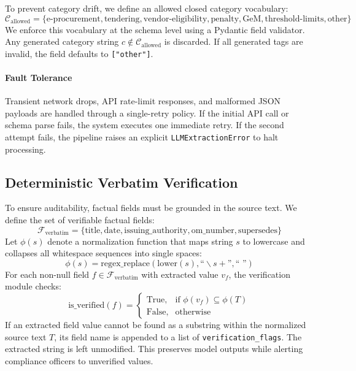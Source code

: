 \documentclass{article}
\begin{document}
To prevent category drift, we define an allowed closed category vocabulary:
\begin{equation}
    \mathcal{C}_{\text{allowed}} = \{\text{e-procurement}, \text{tendering}, \text{vendor-eligibility}, \text{penalty}, \text{GeM}, \text{threshold-limits}, \text{other}\}
\end{equation}
We enforce this vocabulary at the schema level using a Pydantic field validator. Any generated category string $c \notin \mathcal{C}_{\text{allowed}}$ is discarded. If all generated tags are invalid, the field defaults to \texttt{["other"]}.

\paragraph{Fault Tolerance}
Transient network drops, API rate-limit responses, and malformed JSON payloads are handled through a single-retry policy. If the initial API call or schema parse fails, the system executes one immediate retry. If the second attempt fails, the pipeline raises an explicit \texttt{LLMExtractionError} to halt processing.

\subsection{Deterministic Verbatim Verification}
To ensure auditability, factual fields must be grounded in the source text. We define the set of verifiable factual fields:
\begin{equation}
    \mathcal{F}_{\text{verbatim}} = \{\text{title}, \text{date}, \text{issuing\_authority}, \text{om\_number}, \text{supersedes}\}
\end{equation}
Let $\phi(s)$ denote a normalization function that maps string $s$ to lowercase and collapses all whitespace sequences into single spaces:
\begin{equation}
    \phi(s) = \text{regex\_replace}(\text{lower}(s), \text{``}\backslash s+\text{''}, \text{`` ''})
\end{equation}
For each non-null field $f \in \mathcal{F}_{\text{verbatim}}$ with extracted value $v_f$, the verification module checks:
\begin{equation}
    \text{is\_verified}(f) = \begin{cases}
    \text{True}, & \text{if } \phi(v_f) \subseteq \phi(T) \\
    \text{False}, & \text{otherwise}
    \end{cases}
\end{equation}
If an extracted field value cannot be found as a substring within the normalized source text $T$, its field name is appended to a list of \texttt{verification\_flags}. The extracted string is left unmodified. This preserves model outputs while alerting compliance officers to unverified values.
\end{document}
